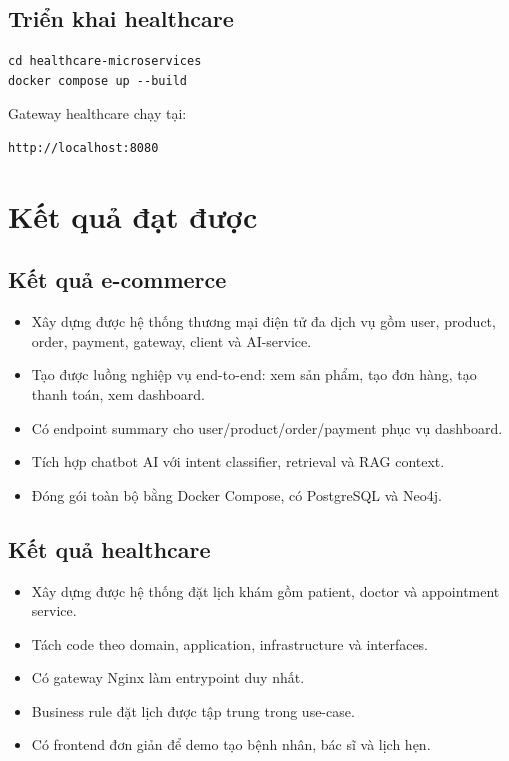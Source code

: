 \documentclass[12pt,a4paper]{report}
\begin{document}
\subsection{Triển khai healthcare}
\begin{lstlisting}[style=code,caption={Chạy healthcare}]
cd healthcare-microservices
docker compose up --build
\end{lstlisting}

Gateway healthcare chạy tại:
\begin{lstlisting}[style=code]
http://localhost:8080
\end{lstlisting}

\section{Kết quả đạt được}
\subsection{Kết quả e-commerce}
\begin{itemize}
  \item Xây dựng được hệ thống thương mại điện tử đa dịch vụ gồm user, product, order, payment, gateway, client và AI-service.
  \item Tạo được luồng nghiệp vụ end-to-end: xem sản phẩm, tạo đơn hàng, tạo thanh toán, xem dashboard.
  \item Có endpoint summary cho user/product/order/payment phục vụ dashboard.
  \item Tích hợp chatbot AI với intent classifier, retrieval và RAG context.
  \item Đóng gói toàn bộ bằng Docker Compose, có PostgreSQL và Neo4j.
\end{itemize}

\subsection{Kết quả healthcare}
\begin{itemize}
  \item Xây dựng được hệ thống đặt lịch khám gồm patient, doctor và appointment service.
  \item Tách code theo domain, application, infrastructure và interfaces.
  \item Có gateway Nginx làm entrypoint duy nhất.
  \item Business rule đặt lịch được tập trung trong use-case.
  \item Có frontend đơn giản để demo tạo bệnh nhân, bác sĩ và lịch hẹn.
\end{itemize}
\end{document}
